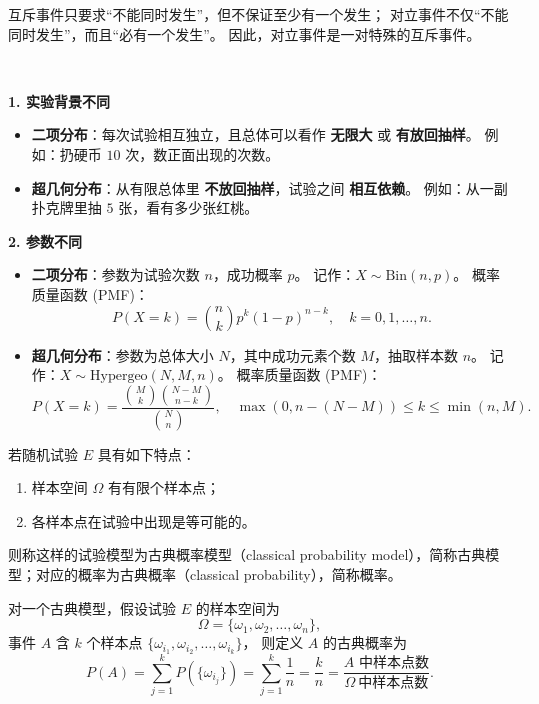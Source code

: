 \begin{remark}
互斥事件只要求“不能同时发生”，但不保证至少有一个发生；  
对立事件不仅“不能同时发生”，而且“必有一个发生”。  
因此，对立事件是一对特殊的互斥事件。
\end{remark}
\begin{proposition}
\,

\textbf{1. 实验背景不同}
\begin{itemize}
  \item \textbf{二项分布}：每次试验相互独立，且总体可以看作 \textbf{无限大} 或 \textbf{有放回抽样}。  
  例如：扔硬币 $10$ 次，数正面出现的次数。
  \item \textbf{超几何分布}：从有限总体里 \textbf{不放回抽样}，试验之间 \textbf{相互依赖}。  
  例如：从一副扑克牌里抽 $5$ 张，看有多少张红桃。
\end{itemize}

\textbf{2. 参数不同}
\begin{itemize}
  \item \textbf{二项分布}：参数为试验次数 $n$，成功概率 $p$。  
  记作：$X \sim \mathrm{Bin}(n,p)$。  
  概率质量函数 (PMF)：
  \[
    P(X=k) = \binom{n}{k} p^k (1-p)^{n-k}, \quad k=0,1,\dots,n.
  \]

  \item \textbf{超几何分布}：参数为总体大小 $N$，其中成功元素个数 $M$，抽取样本数 $n$。  
  记作：$X \sim \mathrm{Hypergeo}(N,M,n)$。  
  概率质量函数 (PMF)：
  \[
    P(X=k) = \frac{\binom{M}{k}\binom{N-M}{n-k}}{\binom{N}{n}}, 
    \quad \max(0,n-(N-M)) \leq k \leq \min(n,M).
  \]
\end{itemize}

\end{proposition}
\begin{definition}[古典概率模型]\label{def:classical}
若随机试验 $E$ 具有如下特点：
\begin{enumerate}
  \item 样本空间 $\Omega$ 有有限个样本点；
  \item 各样本点在试验中出现是等可能的。
\end{enumerate}
则称这样的试验模型为古典概率模型（classical probability model），简称古典模型；对应的概率为古典概率（classical probability），简称概率。
\end{definition}

对一个古典模型，假设试验 $E$ 的样本空间为
\[
\Omega = \{\omega_1,\omega_2,\dots,\omega_n\},
\]
事件 $A$ 含 $k$ 个样本点 $\{\omega_{i_1},\omega_{i_2},\dots,\omega_{i_k}\}$，
则定义 $A$ 的古典概率为
\[
P(A) = \sum_{j=1}^{k} P(\{\omega_{i_j}\})
= \sum_{j=1}^{k} \frac{1}{n}
= \frac{k}{n}
= \frac{\text{$A$ 中样本点数}}{\Omega\ \text{中样本点数}}. \tag{1.2.1}
\]

